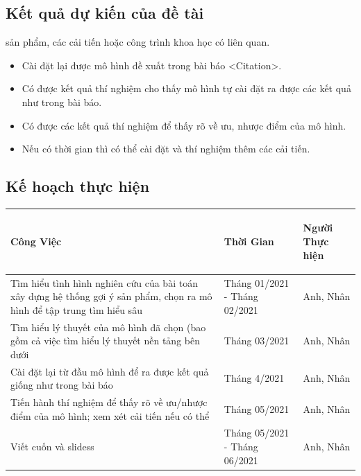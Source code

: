 \documentclass{article}[14pt]
\begin{document}
{    
    \subsection{Kết quả dự kiến của đề tài}
        
sản phẩm, các cải tiến hoặc công trình khoa học có liên quan.
    \begin{itemize}
        \item Cài đặt lại được mô hình đề xuất trong bài báo <Citation>.
        \item Có được kết quả thí nghiệm cho thấy mô hình tự cài đặt ra được 
các kết quả như trong bài báo.
        \item Có được các kết quả thí nghiệm để thấy rõ về ưu, nhược điểm 
của mô hình.
        \item Nếu có thời gian thì có thể cài đặt và thí nghiệm thêm các cải 
tiến.
    \end{itemize}
    
    \subsection{Kế hoạch thực hiện}

\begin{tabular}{ | m{20em} | m{4cm}| m{4cm} | } 

  \hline
   \centering\textbf { Công Việc} &  \centering\textbf{Thời Gian}  & 
\begin{center}
        \textbf{Người Thực hiện}   \end{center} \\ 
  \hline
  Tìm hiểu tình hình nghiên cứu của bài toán xây dựng hệ thống gợi ý sản 
phẩm, chọn ra mô hình để tập trung tìm hiểu sâu & Tháng 01/2021 - Tháng 
02/2021 & Anh, Nhân \\ 
  \hline
  Tìm hiểu lý thuyết của mô hình đã chọn (bao gồm cả việc tìm hiểu lý thuyết 
nền tảng bên dưới &  Tháng 03/2021 & Anh, Nhân \\ 
  \hline
  Cài đặt lại từ đầu mô hình để ra được kết quả giống như trong bài báo &  
Tháng 4/2021 & Anh, Nhân \\
  \hline
  Tiến hành thí nghiệm để thấy rõ về ưu/nhược điểm của mô hình; xem xét cải 
tiến nếu có thể &  Tháng 05/2021 & Anh, Nhân \\
  \hline
 Viết cuốn và slidess &  Tháng 05/2021 - Tháng 06/2021 & Anh, Nhân \\
 \hline
\end{tabular}


   
       
    
    }
    
    
    \nocite{*}
\end{document}
